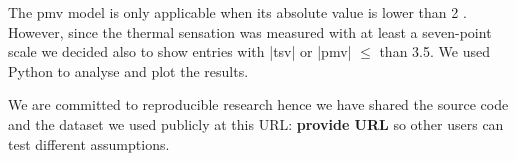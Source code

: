 The \ac{pmv} model is only applicable when its absolute value is lower than 2 \cite{Fanger1970, iso7730}.
However, since the thermal sensation was measured with at least a seven-point scale we decided also to show entries with |\ac{tsv}| or |\ac{pmv}| $\leq$ than \num{3.5}.
We used Python to analyse and plot the results.

We are committed to reproducible research hence we have shared the source code and the dataset we used publicly at this URL: \textbf{provide URL} so other users can test different assumptions.